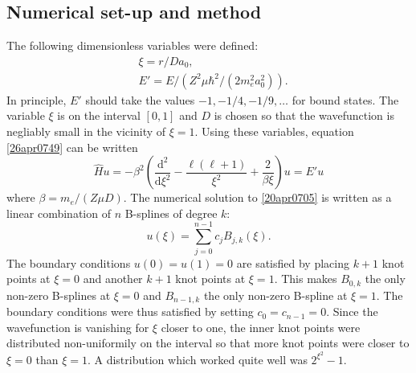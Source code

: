 \documentclass[twocolumn]{article}
\begin{document}
\begin{large}
\subsection*{Numerical set-up and method}
The following dimensionless variables were defined:
\begin{equation}
    \begin{split}
        &\xi = r/Da_0, \\ 
        &E' = E/\left(Z^2\mu\hbar^2/(2m_e^2a_0^2)\right).
    \end{split}
\end{equation}
In principle, $E'$ should take the values $-1,-1/4,-1/9,\dots$ for bound states. The variable $\xi$ is on the interval $[0,1]$ and $D$ is chosen so that the wavefunction is negliably small in the vicinity of $\xi=1$. Using these variables, equation \eqref{26apr0749} can be written
\begin{equation}
    \label{20apr0705}
    \hat{H}u = -\beta^2\left(\frac{\text{d}^2}{\text{d}\xi^2}-\frac{\ell(\ell+1)}{\xi^2}+\frac{2}{\beta\xi}\right)u = E'u
\end{equation}
where $\beta = m_e/(Z\mu D)$. The numerical solution to \eqref{20apr0705} is written as a linear combination of $n$ B-splines of degree $k$:
\begin{equation}
    \label{28apr1521}
    u(\xi) = \sum_{j=0}^{n-1}c_jB_{j,k}(\xi).
\end{equation}
The boundary conditions $u(0) = u(1) = 0$ are satisfied by placing $k+1$ knot points at $\xi=0$ and another $k+1$ knot points at $\xi=1$. This makes $B_{0,k}$ the only non-zero B-splines at $\xi=0$ and $B_{n-1,k}$ the only non-zero B-spline at $\xi = 1$. The boundary conditions were thus satisfied by setting $c_0 = c_{n-1} = 0$. Since the wavefunction is vanishing for $\xi$ closer to one, the inner knot points were distributed non-uniformily on the interval so that more knot points were closer to $\xi=0$ than $\xi=1$. A distribution which worked quite well was $2^{\xi^2}-1$. 


\end{large}
\end{document}
